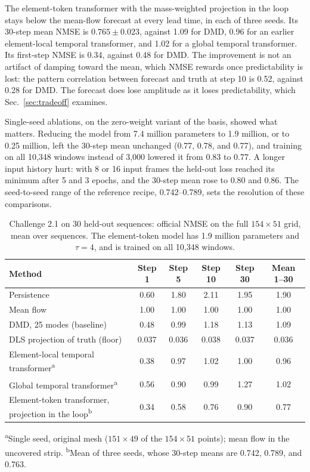 \documentclass[conf]{new-aiaa}
\begin{document}
The element-token transformer with the mass-weighted projection in the loop stays below the mean-flow forecast at every lead time, in each of three seeds. Its 30-step mean NMSE is $0.765\pm0.023$, against 1.09 for DMD, 0.96 for an earlier element-local temporal transformer, and 1.02 for a global temporal transformer. Its first-step NMSE is 0.34, against 0.48 for DMD. The improvement is not an artifact of damping toward the mean, which NMSE rewards once predictability is lost: the pattern correlation between forecast and truth at step 10 is 0.52, against 0.28 for DMD. The forecast does lose amplitude as it loses predictability, which Sec.~\ref{sec:tradeoff} examines.

Single-seed ablations, on the zero-weight variant of the basis, showed what matters. Reducing the model from 7.4 million parameters to 1.9 million, or to 0.25 million, left the 30-step mean unchanged (0.77, 0.78, and 0.77), and training on all 10,348 windows instead of 3,000 lowered it from 0.83 to 0.77. A longer input history hurt: with 8 or 16 input frames the held-out loss reached its minimum after 5 and 3 epochs, and the 30-step mean rose to 0.80 and 0.86. The seed-to-seed range of the reference recipe, 0.742--0.789, sets the resolution of these comparisons.

\begin{table}[!tbp]
  \centering
  \small
  \caption{Challenge 2.1 on 30 held-out sequences: official NMSE on the full $154\times51$ grid, mean over sequences. The element-token model has 1.9 million parameters and $\tau=4$, and is trained on all 10,348 windows.}
  \label{tab:challenge}
  \begin{tabular}{lccccc}
    \toprule
    Method & Step 1 & Step 5 & Step 10 & Step 30 & Mean 1--30 \\
    \midrule
    Persistence & 0.60 & 1.80 & 2.11 & 1.95 & 1.90 \\
    Mean flow & 1.00 & 1.00 & 1.00 & 1.00 & 1.00 \\
    DMD, 25 modes (baseline) & 0.48 & 0.99 & 1.18 & 1.13 & 1.09 \\
    DLS projection of truth (floor) & 0.037 & 0.036 & 0.038 & 0.037 & 0.036 \\
    \midrule
    Element-local temporal transformer\textsuperscript{a} & 0.38 & 0.97 & 1.02 & 1.00 & 0.96 \\
    Global temporal transformer\textsuperscript{a} & 0.56 & 0.90 & 0.99 & 1.27 & 1.02 \\
    Element-token transformer, projection in the loop\textsuperscript{b} & 0.34 & 0.58 & 0.76 & 0.90 & 0.77 \\
    \bottomrule
  \end{tabular}

  \smallskip
  {\footnotesize \textsuperscript{a}Single seed, original mesh ($151\times49$ of the $154\times51$ points); mean flow in the uncovered strip. \textsuperscript{b}Mean of three seeds, whose 30-step means are 0.742, 0.789, and 0.763.}
\end{table}
\end{document}
